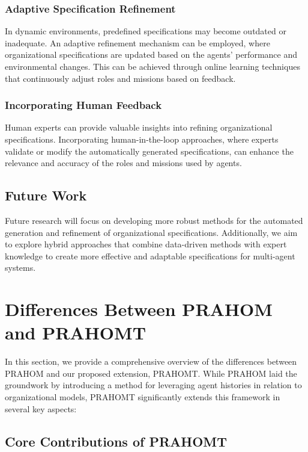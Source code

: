\documentclass[sigconf,anonymous]{aamas}
\begin{document}
\subsubsection{Adaptive Specification Refinement}
In dynamic environments, predefined specifications may become outdated or inadequate. An adaptive refinement mechanism can be employed, where organizational specifications are updated based on the agents' performance and environmental changes. This can be achieved through online learning techniques that continuously adjust roles and missions based on feedback.

\subsubsection{Incorporating Human Feedback}
Human experts can provide valuable insights into refining organizational specifications. Incorporating human-in-the-loop approaches, where experts validate or modify the automatically generated specifications, can enhance the relevance and accuracy of the roles and missions used by agents.

\subsection{Future Work}

Future research will focus on developing more robust methods for the automated generation and refinement of organizational specifications. Additionally, we aim to explore hybrid approaches that combine data-driven methods with expert knowledge to create more effective and adaptable specifications for multi-agent systems.

\section{Differences Between PRAHOM and PRAHOMT}

In this section, we provide a comprehensive overview of the differences between PRAHOM and our proposed extension, PRAHOMT. While PRAHOM laid the groundwork by introducing a method for leveraging agent histories in relation to organizational models, PRAHOMT significantly extends this framework in several key aspects:

\subsection{Core Contributions of PRAHOMT}
\end{document}
